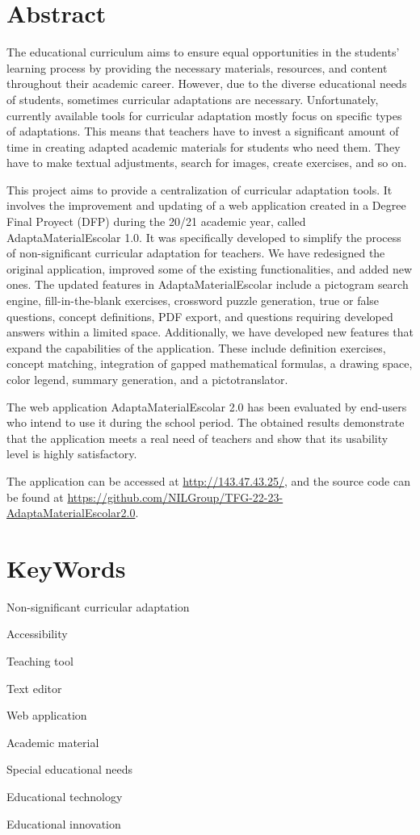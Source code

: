\chapter{Abstract}

The educational curriculum aims to ensure equal opportunities in the students' learning process by providing the necessary materials, resources, and content throughout their academic career. However, due to the diverse educational needs of students, sometimes curricular adaptations are necessary. Unfortunately, currently available tools for curricular adaptation mostly focus on specific types of adaptations. This means that teachers have to invest a significant amount of time in creating adapted academic materials for students who need them. They have to make textual adjustments, search for images, create exercises, and so on.

This project aims to provide a centralization of curricular adaptation tools. It involves the improvement and updating of a web application created in a Degree Final Proyect (DFP) during the 20/21 academic year, called AdaptaMaterialEscolar 1.0. It was specifically developed to simplify the process of non-significant curricular adaptation for teachers. We have redesigned the original application, improved some of the existing functionalities, and added new ones. The updated features in AdaptaMaterialEscolar include a pictogram search engine, fill-in-the-blank exercises, crossword puzzle generation, true or false questions, concept definitions, PDF export, and questions requiring developed answers within a limited space. Additionally, we have developed new features that expand the capabilities of the application. These include definition exercises, concept matching, integration of gapped mathematical formulas, a drawing space, color legend, summary generation, and a pictotranslator.

The web application AdaptaMaterialEscolar 2.0 has been evaluated by end-users who intend to use it during the school period. The obtained results demonstrate that the application meets a real need of teachers and show that its usability level is highly satisfactory.

The application can be accessed at \url{http://143.47.43.25/}, and the source code can be found at \url{https://github.com/NILGroup/TFG-22-23-AdaptaMaterialEscolar2.0}.


\chapter{KeyWords}

Non-significant curricular adaptation

Accessibility

Teaching tool

Text editor

Web application

Academic material

Special educational needs

Educational technology

Educational innovation


